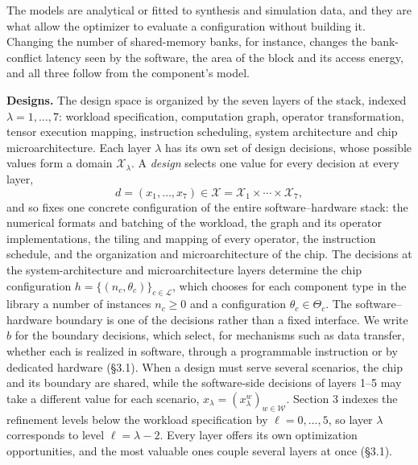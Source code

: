 \documentclass[11pt]{article}
\begin{document}
The models are analytical or fitted to synthesis and simulation data, and they are what allow the optimizer to evaluate a configuration without building it. Changing the number of shared-memory banks, for instance, changes the bank-conflict latency seen by the software, the area of the block and its access energy, and all three follow from the component's model.

\textbf{Designs.} The design space is organized by the seven layers of the stack, indexed \(\lambda=1,\dots,7\): workload specification, computation graph, operator transformation, tensor execution mapping, instruction scheduling, system architecture and chip microarchitecture. Each layer \(\lambda\) has its own set of design decisions, whose possible values form a domain \(\mathcal X_\lambda\). A \emph{design} selects one value for every decision at every layer,
\[
d=(x_1,\dots,x_7)\in\mathcal X=\mathcal X_1\times\cdots\times\mathcal X_7,
\]
and so fixes one concrete configuration of the entire software--hardware stack: the numerical formats and batching of the workload, the graph and its operator implementations, the tiling and mapping of every operator, the instruction schedule, and the organization and microarchitecture of the chip. The decisions at the system-architecture and microarchitecture layers determine the chip configuration \(h=\{(n_c,\theta_c)\}_{c\in\mathcal L}\), which chooses for each component type in the library a number of instances \(n_c\ge0\) and a configuration \(\theta_c\in\Theta_c\). The software--hardware boundary is one of the decisions rather than a fixed interface. We write \(b\) for the boundary decisions, which select, for mechanisms such as data transfer, whether each is realized in software, through a programmable instruction or by dedicated hardware (§3.1). When a design must serve several scenarios, the chip and its boundary are shared, while the software-side decisions of layers 1--5 may take a different value for each scenario, \(x_\lambda=(x_\lambda^w)_{w\in\mathcal W}\). Section 3 indexes the refinement levels below the workload specification by \(\ell=0,\dots,5\), so layer \(\lambda\) corresponds to level \(\ell=\lambda-2\). Every layer offers its own optimization opportunities, and the most valuable ones couple several layers at once (§3.1).
\end{document}
